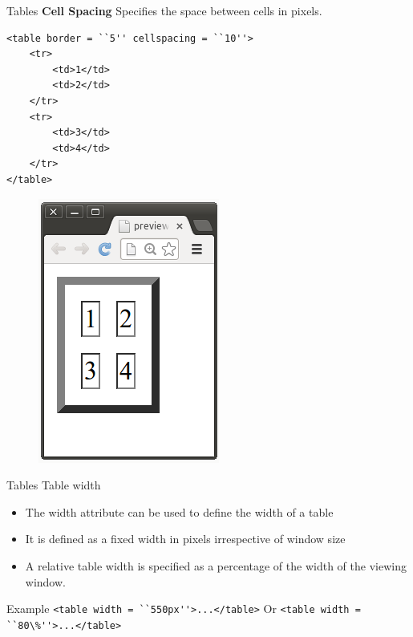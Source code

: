 \documentclass[14pt]{beamer}
\begin{document}
\begin{frame}[fragile]{Tables}
\textbf{Cell Spacing} Specifies the space between cells in pixels.

\begin{minipage}{7cm}
\begin{lstlisting}
<table border = ``5'' cellspacing = ``10''>
    <tr>
        <td>1</td>
        <td>2</td>
    </tr>
    <tr>
        <td>3</td>
        <td>4</td>
    </tr>
</table>
\end{lstlisting}
\end{minipage}
\quad
\begin{minipage}{2cm}
\begin{figure}[H]
 \includegraphics[scale=.3]{tables-cell-spacing.png}
\end{figure}
\end{minipage}
\end{frame}

\begin{frame}{Tables}
Table width
\begin{itemize}
 \item The width attribute can be used to define the width of a table
 \item It is defined as a fixed width in pixels irrespective of window size
 \item A relative table width is specified as a percentage of the width of the viewing window.
\end{itemize}
\begin{block}{Example}
\lstinline!<table width = ``550px''>...</table>!
    Or
\lstinline!<table width = ``80\%''>...</table>!
\end{block}
\end{frame}
\end{document}
